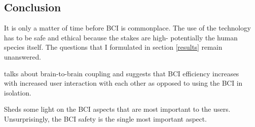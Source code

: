 \documentclass[fleqn,11pt]{olplainarticle}
\begin{document}
\subsection{Conclusion}
It is only a matter of time before BCI is commonplace. The use of the technology has to be safe and ethical because the stakes are high- potentially the human species itself. The questions that I formulated in section \ref{results} remain unanswered.


\cite{sexton2015overlooked} talks about brain-to-brain coupling and suggests that BCI efficiency increases with increased user interaction with each other as opposed to using the BCI in isolation.

\cite{kawala2021summary} Sheds some light on the BCI aspects that are most important to the users. Unsurprisingly, the BCI safety is the single most important aspect.

\printbibliography
\end{document}
